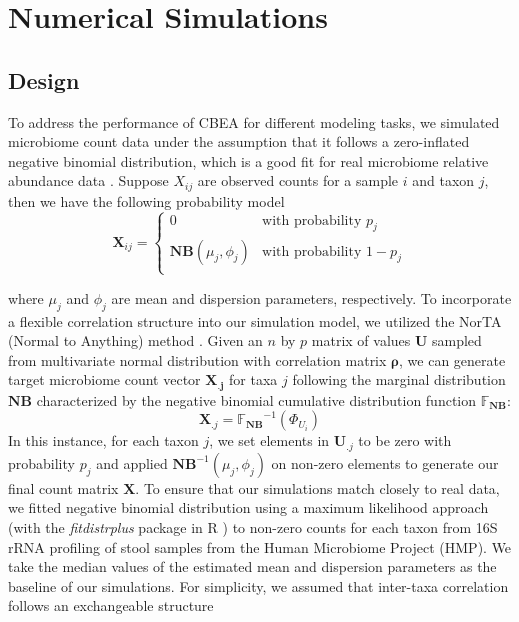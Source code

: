 \documentclass{article}
\begin{document}
\section{Numerical Simulations}
\subsection{Design}
To address the performance of CBEA for different modeling tasks, we simulated microbiome count data under the assumption that it follows a zero-inflated negative binomial distribution, which is a good fit for real microbiome relative abundance data \cite{calgaro2020}. Suppose $X_{ij}$ are observed counts for a sample $i$ and taxon $j$, then we have the following probability model
\begin{equation}
    \mathbf{X}_{ij} =
      \begin{cases}
        0 & \text{with probability $p_j$}\\
        \mathbf{NB}(\mu_j, \phi_j) & \text{with probability $1 - p_j$}\\
      \end{cases}       
\end{equation}

where $\mu_j$ and $\phi_j$ are mean and dispersion parameters, respectively. To incorporate a flexible correlation structure into our simulation model, we utilized the NorTA (Normal to Anything) method \cite{cario1997}. Given an $n$ by $p$ matrix of values $\mathbf{U}$ sampled from multivariate normal distribution with correlation matrix $\mathbf{\rho}$, we can generate target microbiome count vector $\mathbf{X_{.j}}$ for taxa $j$ following the marginal distribution $\mathbf{NB}$ characterized by the negative binomial cumulative distribution function $\mathbb{F_{\mathbf{NB}}}$:
\begin{equation}
    \mathbf{X}_{.j} = \mathbb{F_{\mathbf{NB}}}^{-1}(\Phi_{U_i})
\end{equation}
In this instance, for each taxon $j$, we set elements in $\mathbf{U}_{.j}$ to be zero with probability $p_j$ and applied $\mathbf{NB}^{-1}(\mu_j, \phi_j)$ on non-zero elements to generate our final count matrix $\mathbf{X}$. To ensure that our simulations match closely to real data, we fitted negative binomial distribution using a maximum likelihood approach (with the \emph{fitdistrplus} package in R \cite{delignette-muller2015}) to non-zero counts for each taxon from 16S rRNA profiling of stool samples from the Human Microbiome Project (HMP). We take the median values of the estimated mean and dispersion parameters as the baseline of our simulations. For simplicity, we assumed that inter-taxa correlation follows an exchangeable structure
\end{document}
